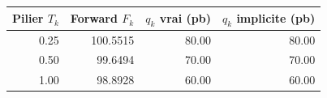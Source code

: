 {\small\begin{tabular}{rrrr}
\toprule
Pilier $T_k$ & Forward $F_k$ & $q_k$ vrai (pb) & $q_k$ implicite (pb) \\
\midrule
\num{0.25} & \num{100.5515} & \num{80.00} & \num{80.00} \\
\num{0.50} & \num{99.6494} & \num{70.00} & \num{70.00} \\
\num{1.00} & \num{98.8928} & \num{60.00} & \num{60.00} \\
\bottomrule
\end{tabular}}
